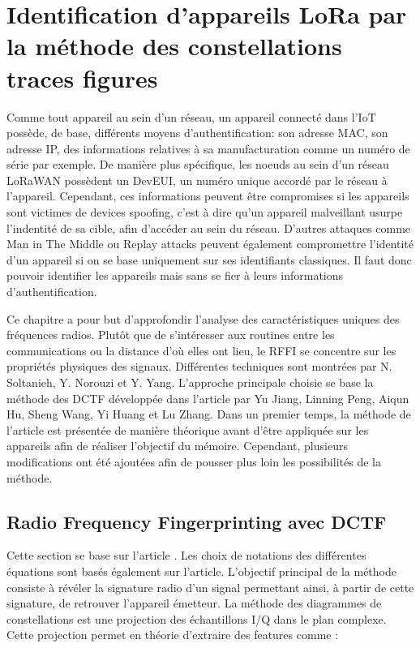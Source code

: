 \renewcommand{\leftmark}{IDENTIFICATION}

\chapter{Identification d'appareils LoRa par la méthode des constellations traces figures}

Comme tout appareil au sein d'un réseau, un appareil connecté dans l'\ac{IoT} possède, de base, différents moyens d'authentification: son adresse \ac{MAC}, son adresse IP, des informations relatives à sa manufacturation comme un numéro de série par exemple. De manière plus spécifique, les noeuds au sein d'un réseau LoRaWAN possèdent un DevEUI, un numéro unique accordé par le réseau à l'appareil. Cependant, ces informations peuvent être compromises si les appareils sont victimes de devices spoofing, c'est à dire qu'un appareil malveillant usurpe l'indentité de sa cible, afin d'accéder au sein du réseau. D'autres attaques comme Man in The Middle ou Replay attacks peuvent également compromettre l'identité d'un appareil si on se base uniquement sur ses identifiants classiques\cite{attack}. Il faut donc pouvoir identifier les appareils mais sans se fier à leurs informations d'authentification.

\vspace{0.1cm}

Ce chapitre a pour but d'approfondir l'analyse des caractéristiques uniques des fréquences radios. Plutôt que de s'intéresser aux routines entre les communications ou la distance d'où elles ont lieu, le \ac{RFFI} se concentre sur les propriétés physiques des signaux. Différentes techniques sont montrées par N. Soltanieh, Y. Norouzi et Y. Yang\cite{rffi1}. L'approche principale choisie se base la méthode des \ac{DCTF} développée dans l'article \cite{loraDCTF} par Yu Jiang, Linning Peng, Aiqun Hu, Sheng Wang, Yi Huang et Lu Zhang. Dans un premier temps, la méthode de l'article est présentée de manière théorique avant d'être appliquée sur les appareils afin de réaliser l'objectif du mémoire. Cependant, plusieurs modifications ont été ajoutées afin de pousser plus loin les possibilités de la méthode.

\section{Radio Frequency Fingerprinting avec DCTF}\label{DCTF}

Cette section se base sur l'article \cite{loraDCTF}. Les choix de notations des différentes équations sont basés également sur l'article. L'objectif principal de la méthode consiste à révéler la signature radio d'un signal permettant ainsi, à partir de cette signature, de retrouver l'appareil émetteur. La méthode des diagrammes de constellations est une projection des échantillons \ac{I/Q} dans le plan complexe. Cette projection permet en théorie d'extraire des features comme :

